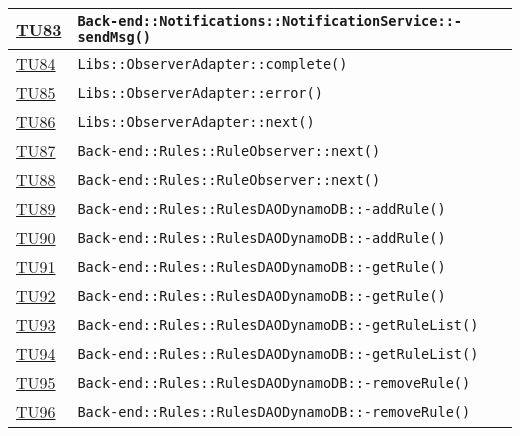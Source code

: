 \begin{longtable}{|>{\centering}m{1cm}|m{12cm}<{\centering}|}
\hyperlink{TU83}{TU83} & \texttt{Back-end::Notifications::NotificationService::-\linebreak sendMsg()}\\ \hline

\hyperlink{TU84}{TU84} & \texttt{Libs::ObserverAdapter::complete()}\\ \hline

\hyperlink{TU85}{TU85} & \texttt{Libs::ObserverAdapter::error()}\\ \hline

\hyperlink{TU86}{TU86} & \texttt{Libs::ObserverAdapter::next()}\\ \hline

\hyperlink{TU87}{TU87} & \texttt{Back-end::Rules::RuleObserver::next()}\\ \hline

\hyperlink{TU88}{TU88} & \texttt{Back-end::Rules::RuleObserver::next()}\\ \hline

\hyperlink{TU89}{TU89} & \texttt{Back-end::Rules::RulesDAODynamoDB::-\linebreak addRule()}\\ \hline

\hyperlink{TU90}{TU90} & \texttt{Back-end::Rules::RulesDAODynamoDB::-\linebreak addRule()}\\ \hline

\hyperlink{TU91}{TU91} & \texttt{Back-end::Rules::RulesDAODynamoDB::-\linebreak getRule()}\\ \hline

\hyperlink{TU92}{TU92} & \texttt{Back-end::Rules::RulesDAODynamoDB::-\linebreak getRule()}\\ \hline

\hyperlink{TU93}{TU93} & \texttt{Back-end::Rules::RulesDAODynamoDB::-\linebreak getRuleList()}\\ \hline

\hyperlink{TU94}{TU94} & \texttt{Back-end::Rules::RulesDAODynamoDB::-\linebreak getRuleList()}\\ \hline

\hyperlink{TU95}{TU95} & \texttt{Back-end::Rules::RulesDAODynamoDB::-\linebreak removeRule()}\\ \hline

\hyperlink{TU96}{TU96} & \texttt{Back-end::Rules::RulesDAODynamoDB::-\linebreak removeRule()}\\ \hline


\end{longtable}
